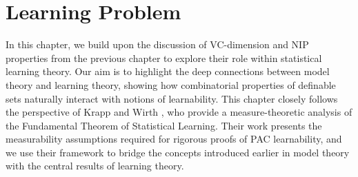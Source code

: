 \chapter{Learning Problem}

In this chapter, we build upon the discussion of VC-dimension and NIP properties from the previous chapter to explore their role within statistical learning theory. Our aim is to highlight the deep connections between model theory and learning theory, showing how combinatorial properties of definable sets naturally interact with notions of learnability. This chapter closely follows the perspective of Krapp and Wirth \cite{KrappWirth2021}, who provide a measure-theoretic analysis of the Fundamental Theorem of Statistical Learning. Their work presents the measurability assumptions required for rigorous proofs of PAC learnability, and we use their framework to bridge the concepts introduced earlier in model theory with the central results of learning theory.


